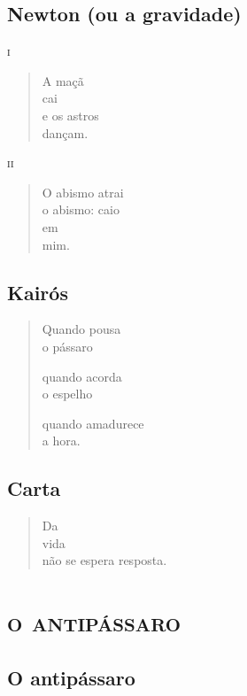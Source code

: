 \chapter{Newton (ou a gravidade)}

\forceindent\textsc{i}

\begin{verse}
A maçã\\
cai\\
e os astros\\
dançam.
\end{verse}

\medskip
\textsc{ii}

\begin{verse}
O abismo atrai\\
o abismo: caio\\
em\\
mim.
\end{verse}

\chapter{Kairós}

\begin{verse}
Quando pousa\\
o pássaro

quando acorda\\
o espelho

quando amadurece\\
a hora.
\end{verse}

\chapter{Carta}

\begin{verse}
Da\\
vida\\
não se espera resposta.
\end{verse}

\part*{\textsc{o antipássaro}}

\chapter{O antipássaro}

